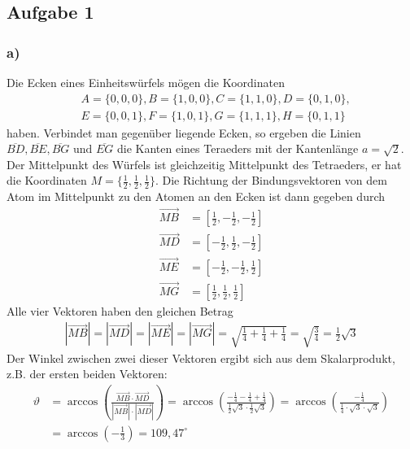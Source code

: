 \documentclass[11pt]{article}
\begin{document}
\subsection*{Aufgabe 1}

\subsubsection*{a)}Die Ecken eines Einheitswürfels mögen die Koordinaten
\begin{align*}
&A = \{0,0,0\}, B = \{1,0,0\}, C = \{1,1,0\}, D = \{0,1,0\},\\
&E = \{0,0,1\}, F = \{1,0,1\}, G = \{1,1,1\}, H = \{0,1,1\}
\end{align*}
haben. Verbindet man gegenüber liegende Ecken, so ergeben die Linien $\overline{BD}, \overline{BE}, \overline{BG} \text{ und } \overline{EG}$ die Kanten eines Teraeders mit der Kantenlänge $a = \sqrt{2}$. Der Mittelpunkt des Würfels ist gleichzeitig
Mittelpunkt des Tetraeders, er hat die Koordinaten
$M = \{\frac{1}{2}, \frac{1}{2}, \frac{1}{2}\}$. Die Richtung der Bindungsvektoren
von dem Atom im Mittelpunkt zu den Atomen an den Ecken ist dann gegeben durch
\begin{align*}
\overrightarrow{MB} &= \left[\frac{1}{2}, -\frac{1}{2}, -\frac{1}{2}\right]\\
\overrightarrow{MD} &= \left[-\frac{1}{2}, \frac{1}{2}, -\frac{1}{2}\right]\\
\overrightarrow{ME} &= \left[-\frac{1}{2}, -\frac{1}{2}, \frac{1}{2}\right]\\
\overrightarrow{MG} &= \left[\frac{1}{2}, \frac{1}{2}, \frac{1}{2}\right]
\end{align*}
Alle vier Vektoren haben den gleichen Betrag
\begin{align*}
\left|\overrightarrow{MB}\right| = \left|\overrightarrow{MD}\right| =
\left|\overrightarrow{ME}\right| = \left|\overrightarrow{MG}\right| =
\sqrt{\frac{1}{4}+\frac{1}{4}+\frac{1}{4}} = \sqrt{\frac{3}{4}} = \frac{1}{2} \sqrt{3}
\end{align*}
Der Winkel zwischen zwei dieser Vektoren ergibt sich aus dem Skalarprodukt,
z.B. der ersten beiden Vektoren:
\begin{align*}
  \vartheta &= \arccos \left(\frac {\overrightarrow{MB} \cdot \overrightarrow{MD}}
  {\left|\overrightarrow{MB}\right| \cdot \left|\overrightarrow{MD}\right|} \right) =
  \arccos  \left(\frac{-\frac{1}{4}-\frac{1}{4}+\frac{1}{4}}
    {\frac{1}{2} \sqrt{3} \cdot \frac{1}{2} \sqrt{3}} \right)
    = \arccos \left(\frac{-\frac{1}{4}}{\frac{1}{4} \cdot  \sqrt{3} \cdot \sqrt{3}} \right)
    \\&= \arccos \left( -\frac{1}{3} \right) = 109,47^{\circ}
\end{align*}
\end{document}
